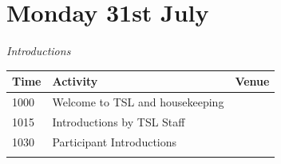 \documentclass[12pt,]{book}
\begin{document}
\section*{Monday 31st July}\label{monday-31st-july}

\emph{Introductions}

\begin{longtable}[]{@{}lll@{}}
\toprule
\begin{minipage}[b]{0.09\columnwidth}\raggedright\strut
Time\strut
\end{minipage} & \begin{minipage}[b]{0.38\columnwidth}\raggedright\strut
Activity\strut
\end{minipage} & \begin{minipage}[b]{0.38\columnwidth}\raggedright\strut
Venue\strut
\end{minipage}\tabularnewline
\midrule
\endhead
\begin{minipage}[t]{0.09\columnwidth}\raggedright\strut
1000\strut
\end{minipage} & \begin{minipage}[t]{0.38\columnwidth}\raggedright\strut
Welcome to TSL and housekeeping\strut
\end{minipage} & \begin{minipage}[t]{0.38\columnwidth}\raggedright\strut
\strut
\end{minipage}\tabularnewline
\begin{minipage}[t]{0.09\columnwidth}\raggedright\strut
1015\strut
\end{minipage} & \begin{minipage}[t]{0.38\columnwidth}\raggedright\strut
Introductions by TSL Staff\strut
\end{minipage} & \begin{minipage}[t]{0.38\columnwidth}\raggedright\strut
\strut
\end{minipage}\tabularnewline
\begin{minipage}[t]{0.09\columnwidth}\raggedright\strut
1030\strut
\end{minipage} & \begin{minipage}[t]{0.38\columnwidth}\raggedright\strut
Participant Introductions\strut
\end{minipage} & \begin{minipage}[t]{0.38\columnwidth}\raggedright\strut
\strut
\end{minipage}\tabularnewline
\begin{minipage}[t]{0.09\columnwidth}\raggedright\strut

\end{minipage}
\end{longtable}
\end{document}
